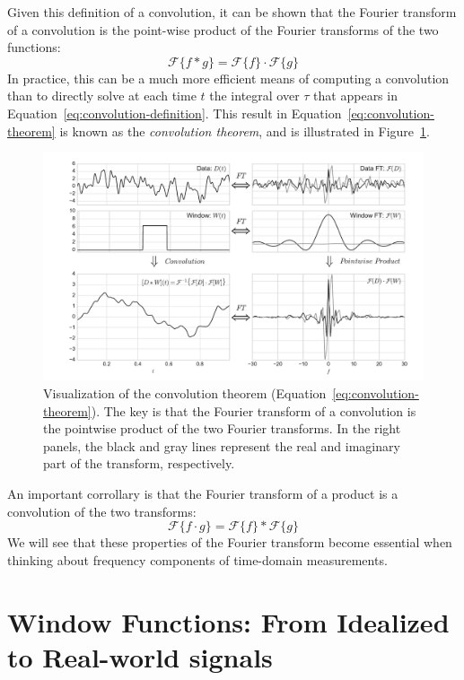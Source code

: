 \documentclass[preprint]{aastex}
\newcommand{\fig}[1]{Figure~\ref{fig:#1}}
\newcommand{\figlabel}[1]{\label{fig:#1}}
\newcommand{\Eq}[1]{Equation~\ref{eq:#1}}
\newcommand{\eq}[1]{\Eq{#1}}
\newcommand{\eqlabel}[1]{\label{eq:#1}}
\newcommand{\sectlabel}[1]{\label{sect:#1}}
\begin{document}
Given this definition of a convolution, it can be shown that the Fourier transform of a convolution is the point-wise product of the Fourier transforms of
the two functions:
\begin{equation}
  \mathcal{F}\{f \ast g\} = \mathcal{F}\{f\} \cdot \mathcal{F}\{g\}
  \eqlabel{convolution-theorem}
\end{equation}
In practice, this can be a much more efficient means of computing a convolution
than to directly solve at each time $t$ the integral over $\tau$ that appears
in \eq{convolution-definition}.
This result in \eq{convolution-theorem} is known as the
{\it convolution theorem}, and is illustrated in \fig{convolution-theorem}.
\begin{figure}[ht]
  \centering
  \includegraphics[width=\textwidth]{fig05_Convolution_Theorem}
  \caption{Visualization of the convolution theorem (\eq{convolution-theorem}).
    The key is that the Fourier transform of
    a convolution is the pointwise product of the two Fourier transforms.
    In the right panels, the black and gray lines represent the real and
    imaginary part of the transform, respectively.
    \figlabel{convolution-theorem}}
\end{figure}
An important corrollary is that the Fourier transform of a product is a convolution of the two transforms:
\begin{equation}
  \mathcal{F}\{f \cdot g\} = \mathcal{F}\{f\} \ast \mathcal{F}\{g\}
  \eqlabel{convolution-theorem-inverse}
\end{equation}
We will see that these properties of the Fourier transform become essential
when thinking about frequency components of time-domain measurements.


\section{Window Functions: From Idealized to Real-world signals}
\sectlabel{window-functions}
\end{document}
